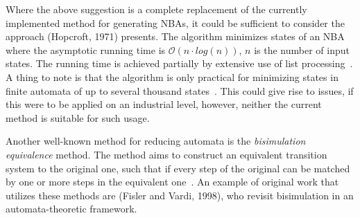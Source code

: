 Where the above suggestion is a complete replacement of the currently implemented method for generating NBAs, it could be sufficient to consider the approach (Hopcroft, 1971)\cite{hopcroft1971n} presents. The algorithm minimizes states of an NBA where the asymptotic running time is $\mathcal{O}(n \cdot log(n))$, $n$ is the number of input states. The running time is achieved partially by extensive use of list processing~\cite{hopcroft1971n}. A thing to note is that the algorithm is only practical for minimizing states in finite automata of up to several thousand states~\cite{hopcroft1971n}. This could give rise to issues, if this were to be applied on an industrial level, however, neither the current method is suitable for such usage.

Another well-known method for reducing automata is the \emph{bisimulation equivalence} method. The method aims to construct an equivalent transition system to the original one, such that if every step of the original can be matched by one or more steps in the equivalent one~\cite{baier2008principles}. An example of original work that utilizes these methods are (Fisler and Vardi, 1998)\cite{fisler1998a}, who revisit bisimulation in an automata-theoretic framework.

